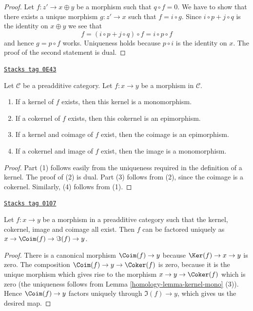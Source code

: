 \begin{proof}
Let $f : z' \to x \oplus y$ be a morphism such that $q \circ f = 0$.
We have to show that there exists a unique morphism $g : z' \to x$
such that $f = i \circ g$. Since $i \circ p + j \circ q$ is the identity on
$x \oplus y$ we see that
$$
f = (i \circ p + j \circ q) \circ f = i \circ p \circ f
$$
and hence $g = p \circ f$ works. Uniqueness holds because $p \circ i$
is the identity on $x$. The proof of the second statement is dual.
\end{proof}

\begin{lemma}
\label{homology-lemma-kernel-mono}
\href{https://stacks.math.columbia.edu/tag/0E43}{\texttt{Stacks tag 0E43}}

Let $\mathcal{C}$ be a preadditive category.
Let $f : x \to y$ be a morphism in $\mathcal{C}$.
\begin{enumerate}
\item If a kernel of $f$ exists, then
this kernel is a monomorphism.
\item If a cokernel of $f$ exists, then
this cokernel is an epimorphism.
\item If a kernel and coimage of $f$ exist, then
the coimage is an epimorphism.
\item If a cokernel and image of $f$ exist, then
the image is a monomorphism.
\end{enumerate}
\end{lemma}

\begin{proof}
Part (1) follows easily from the uniqueness required in the
definition of a kernel. The proof of (2) is dual.
Part (3) follows from (2), since the coimage is a cokernel.
Similarly, (4) follows from (1).
\end{proof}

\begin{lemma}
\label{homology-lemma-coim-im-map}
\href{https://stacks.math.columbia.edu/tag/0107}{\texttt{Stacks tag 0107}}

Let $f : x \to y$ be a morphism in a preadditive category
such that the kernel, cokernel, image and coimage all exist.
Then $f$ can be factored uniquely as
$x \to \Coim(f) \to \Im(f) \to y$.
\end{lemma}

\begin{proof}

There is a canonical morphism $\Coim(f) \to y$
because $\Ker(f) \to x \to y$ is zero.
The composition $\Coim(f) \to y \to \Coker(f)$
is zero, because it is the unique morphism which gives
rise to the morphism $x \to y \to \Coker(f)$ which
is zero
(the uniqueness follows from
Lemma \ref{homology-lemma-kernel-mono} (3)).
Hence $\Coim(f) \to y$ factors uniquely through
$\Im(f) \to y$, which gives us the desired map.
\end{proof}

